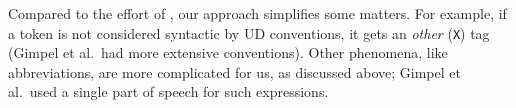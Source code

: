 \documentclass[11pt,a4paper]{article}
\newcommand{\heart}{\ensuremath\heartsuit}
\begin{document}

Compared to the effort of
, our approach simplifies some
matters.  For example, if a token is not considered syntactic by UD
conventions, it gets an \emph{other} (\texttt{X}) tag (Gimpel et
al.~had more extensive conventions).  Other phenomena, like
abbreviations, are more complicated for us, as discussed above;
Gimpel et al.~used a single part of speech for such expressions.

\end{document}

